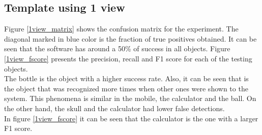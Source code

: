 	\subsection{Template using 1 view}
	Figure \ref{1view_matrix} shows the confusion matrix for the experiment. 
	The diagonal marked in blue color is the fraction of true positives obtained. 
	It can be seen that the software has around a 50\% of success in all objects. 
	Figure \ref{1view_fscore} presents the precision, recall and F1 score for each of the testing objects. 
	\\
	The bottle is the object with a higher success rate. 
	Also, it can be seen that is the object that was recognized more times when other ones were shown to the system. 
	This phenomena is similar in the mobile, the calculator and the ball. 
	On the other hand, the skull and the calculator had lower false detections. 
	\\

	In figure \ref{1view_fscore} it can be seen that the calculator is the one with a larger F1 score. 

